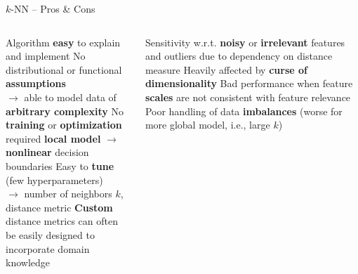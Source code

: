 \begin{frame}{$k$-NN -- Pros \& Cons}

\footnotesize

\begin{columns}[onlytextwidth]
  \begin{column}{0.5\textwidth}
    \footnotesize
    \begin{itemize}
      \positem Algorithm \textbf{easy} to explain and implement
      \positem No distributional or functional \textbf{assumptions}\\
      $\rightarrow$ able to model data of \textbf{arbitrary complexity} %
      \positem No \textbf{training} or \textbf{optimization} required 
      \positem \textbf{local model} $\rightarrow$ \textbf{nonlinear} decision boundaries
      \positem Easy to \textbf{tune} (few hyperparameters)\\
      $\rightarrow$ number of neighbors $k$, distance metric
      \positem \textbf{Custom} distance metrics can often be easily designed to incorporate domain knowledge
    \end{itemize}
  \end{column}
  \begin{column}{0.5\textwidth}
    \footnotesize
    \begin{itemize}
      \negitem Sensitivity w.r.t. \textbf{noisy} or \textbf{irrelevant} features and outliers due to dependency on distance measure
      \negitem Heavily affected by \textbf{curse of dimensionality}
      \negitem Bad performance when feature \textbf{scales} are not consistent with feature relevance
      \negitem Poor handling of data \textbf{imbalances} (worse for more global model, i.e., large $k$)
    \end{itemize}
  \end{column}
\end{columns}

\vfill

\small


\end{frame}
